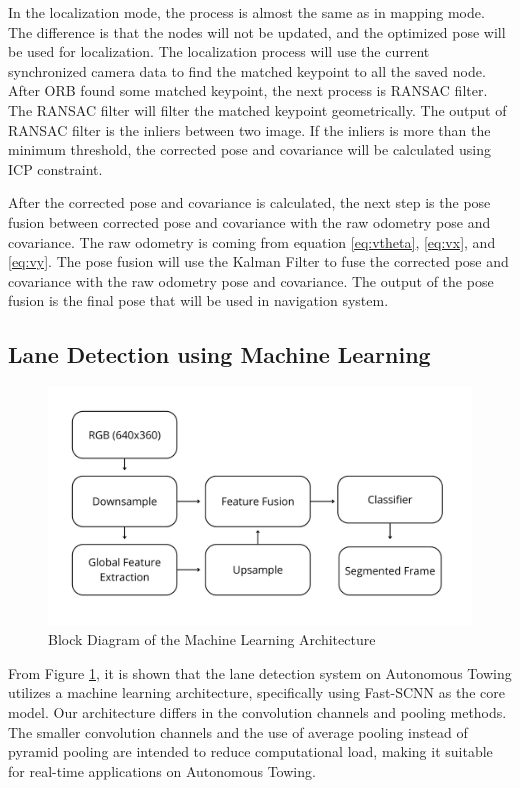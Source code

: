 \documentclass[conference]{IEEEtran}
\begin{document}
In the localization mode, the process is almost the same as in mapping mode. The difference is that the nodes will not be updated, and the optimized pose will be used for localization. The localization process will use the current synchronized camera data to find the matched keypoint to all the saved node. After ORB found some matched keypoint, the next process is RANSAC filter. The RANSAC filter will filter the matched keypoint geometrically. The output of RANSAC filter is the inliers between two image. If the inliers is more than the minimum threshold, the corrected pose and covariance will be calculated using ICP constraint. 

\par    
After the corrected pose and covariance is calculated, the next step is the pose fusion between corrected pose and covariance with the raw odometry pose and covariance. The raw odometry is coming from equation \ref{eq:vtheta}, \ref{eq:vx}, and \ref{eq:vy}. The pose fusion will use the Kalman Filter to fuse the corrected pose and covariance with the raw odometry pose and covariance. The output of the pose fusion is the final pose that will be used in navigation system.

\subsection{Lane Detection using Machine Learning}
\begin{figure}[H]
	\centering
	\includegraphics[width=\linewidth]{../konten/ml_sys.png}
	\caption{Block Diagram of the Machine Learning Architecture}
	\label{fig:ml_system}
\end{figure} 


From Figure \ref{fig:ml_system}, it is shown that the lane detection system on Autonomous Towing utilizes a machine learning architecture, specifically using Fast-SCNN \cite{ref_fast_scnn} as the core model. Our architecture differs in the convolution channels and pooling methods. The smaller convolution channels and the use of average pooling instead of pyramid pooling are intended to reduce computational load, making it suitable for real-time applications on Autonomous Towing.
\end{document}
